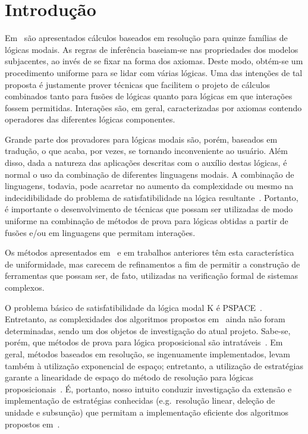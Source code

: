 \chapter{Introdução}

Em~\cite{nalon} são apresentados cálculos baseados em resolução para quinze
famílias de lógicas modais. As regras de inferência baseiam-se nas propriedades
dos modelos subjacentes, ao invés de se fixar na forma dos axiomas. Deste modo,
obtém-se um procedimento uniforme para se lidar com várias lógicas. Uma das
intenções de tal proposta é justamente prover técnicas que facilitem o projeto
de cálculos combinados tanto para fusões de lógicas quanto para lógicas em que
interações fossem permitidas. Interações são, em geral, caracterizadas por
axiomas contendo operadores das diferentes lógicas componentes.

Grande parte dos provadores para lógicas modais são, porém, baseados em
tradução, o que acaba, por vezes, se tornando inconveniente ao usuário. Além
disso, dada a natureza das aplicações descritas com o auxílio destas lógicas, é
normal o uso da combinação de diferentes linguagens modais. A combinação de
linguagens, todavia, pode acarretar no aumento da complexidade ou mesmo na
indecidibilidade do problema de satisfatibilidade na lógica
resultante~\cite{mdml}. %
Portanto, é importante o desenvolvimento de técnicas que possam ser utilizadas
de modo uniforme na combinação de métodos de prova para lógicas obtidas a partir
de fusões e/ou em linguagens que permitam interações.

Os métodos apresentados em~\cite{nalon} e em trabalhos anteriores têm esta
característica de uniformidade, mas carecem de refinamentos a fim de permitir a
construção de ferramentas que possam ser, de fato, utilizadas na verificação
formal de sistemas complexos.

O problema básico de satisfatibilidade da lógica modal K é
PSPACE~\cite{complex_modal}. %
Entretanto, as complexidades dos algoritmos propostos em~\cite{nalon} ainda não
foram determinadas, %
sendo um dos objetos de investigação do atual projeto. Sabe-se, porém, que
métodos de prova para lógica proposicional são
intratáveis~\cite{complex_thproving}. %
Em geral, métodos baseados em resolução, se ingenuamente implementados, levam
também à utilização exponencial de espaço; entretanto, a utilização de
estratégias garante a linearidade de espaço do método de resolução para lógicas
proposicionais~\cite{toran:prop_resolution}. %
É, portanto, nosso intuito conduzir investigação da extensão e implementação de
estratégias conhecidas (e.g.\ resolução linear, deleção de unidade e subsunção)
que permitam a implementação eficiente dos algoritmos propostos em~\cite{nalon}.

